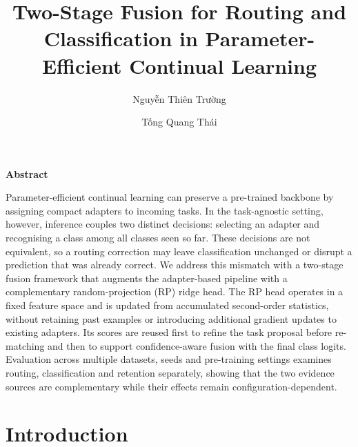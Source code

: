 \documentclass[runningheads]{llncs}
\renewenvironment{abstract}{%
  \par\addvspace{.35cm}%
  \begin{center}\large\bfseries\abstractname\end{center}%
  \vspace{-.5em}%
  \list{}{\small
    \setlength{\leftmargin}{1cm}%
    \setlength{\rightmargin}{1cm}%
    \setlength{\labelwidth}{0pt}%
    \setlength{\listparindent}{0pt}%
    \setlength{\itemindent}{0pt}%
    \setlength{\topsep}{0pt}%
    \setlength{\partopsep}{0pt}%
    \setlength{\parsep}{0pt}%
    \setlength{\itemsep}{0pt}}%
  \item\relax
}{\endlist}
\begin{document}
%
\renewcommand{\abstractname}{Abstract}
%
\title{Two-Stage Fusion for Routing and Classification in
Parameter-Efficient Continual Learning}
%
%
\author{Nguyễn Thiên Trường \and Tống Quang Thái}
%
%
%
\maketitle
\pagestyle{empty}
\thispagestyle{empty}
%
\begin{abstract}
Parameter-efficient continual learning can preserve a pre-trained backbone by
assigning compact adapters to incoming tasks. In the task-agnostic setting,
however, inference couples two distinct decisions: selecting an adapter and
recognising a class among all classes seen so far. These decisions are not
equivalent, so a routing correction may leave classification unchanged or
disrupt a prediction that was already correct. We address this mismatch with a
two-stage fusion framework that augments the adapter-based pipeline with a
complementary random-projection (RP) ridge head. The RP head operates in a
fixed feature space and is updated from accumulated second-order statistics,
without retaining past examples or introducing additional gradient updates to
existing adapters. Its scores are reused first to refine the task proposal
before re-matching and then to support confidence-aware fusion with the final
class logits. Evaluation across multiple datasets, seeds and pre-training
settings examines routing, classification and retention separately, showing
that the two evidence sources are complementary while their effects remain
configuration-dependent.

\end{abstract}
%
%
%
\section{Introduction}
\end{document}
